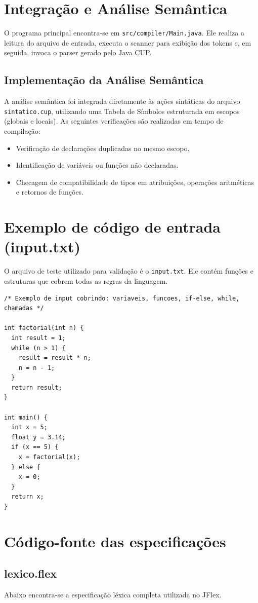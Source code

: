 \documentclass[a4paper,12pt]{article}
\begin{document}
\section{Integração e Análise Semântica}
O programa principal encontra-se em \texttt{src/compiler/Main.java}. Ele realiza a leitura do arquivo de entrada, executa o scanner para exibição dos tokens e, em seguida, invoca o parser gerado pelo Java CUP.

\subsection{Implementação da Análise Semântica}
A análise semântica foi integrada diretamente às ações sintáticas do arquivo \texttt{sintatico.cup}, utilizando uma Tabela de Símbolos estruturada em escopos (globais e locais). As seguintes verificações são realizadas em tempo de compilação:
\begin{itemize}
  \item Verificação de declarações duplicadas no mesmo escopo.
  \item Identificação de variáveis ou funções não declaradas.
  \item Checagem de compatibilidade de tipos em atribuições, operações aritméticas e retornos de funções.
\end{itemize}

\section{Exemplo de código de entrada (input.txt)}
O arquivo de teste utilizado para validação é o \texttt{input.txt}. Ele contém funções e estruturas que cobrem todas as regras da linguagem.

\begin{verbatim}
/* Exemplo de input cobrindo: variaveis, funcoes, if-else, while, chamadas */

int factorial(int n) {
  int result = 1;
  while (n > 1) {
    result = result * n;
    n = n - 1;
  }
  return result;
}

int main() {
  int x = 5;
  float y = 3.14;
  if (x == 5) {
    x = factorial(x);
  } else {
    x = 0;
  }
  return x;
}
\end{verbatim}

\section{Código-fonte das especificações}

\subsection{lexico.flex}
Abaixo encontra-se a especificação léxica completa utilizada no JFlex.
\end{document}
